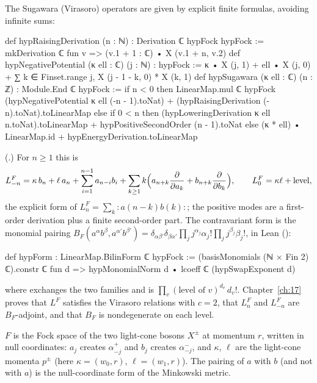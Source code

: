 The Sugawara (Virasoro) operators are given by explicit finite formulas, avoiding infinite sums:
\begin{leancode}
def hypRaisingDerivation (n : ℕ) : Derivation ℂ hypFock hypFock :=
  mkDerivation ℂ fun v => (v.1 + 1 : ℂ) • X (v.1 + n, v.2)
def hypNegativePotential (κ ell : ℂ) (j : ℕ) : hypFock :=
  κ • X (j, 1) + ell • X (j, 0) +
    ∑ k ∈ Finset.range j, X (j - 1 - k, 0) * X (k, 1)
def hypSugawara (κ ell : ℂ) (n : ℤ) : Module.End ℂ hypFock :=
  if n < 0 then
    LinearMap.mul ℂ hypFock (hypNegativePotential κ ell (-n - 1).toNat) +
      (hypRaisingDerivation (-n).toNat).toLinearMap
  else if 0 < n then
    (hypLoweringDerivation κ ell n.toNat).toLinearMap +
      hypPositiveSecondOrder (n - 1).toNat
  else (κ * ell) • LinearMap.id + hypEnergyDerivation.toLinearMap
\end{leancode}
(.)  For $n\ge1$ this is
\begin{equation}\label{ch18:eq:sugawara}
  L^F_{-n}=\kappa\,b_n+\ell\,a_n+\sum_{i=1}^{n-1}a_{n-i}b_i+\sum_{k\ge1}k\Bigl(a_{n+k}\frac{\partial}{\partial a_k}
  +b_{n+k}\frac{\partial}{\partial b_k}\Bigr),\qquad L^F_0=\kappa\ell+\text{level},
\end{equation}
the explicit form of $L^F_n=\sum_k{:}a(n-k)b(k){:}$; the positive modes are a first-order derivation plus a
finite second-order part.  The contravariant form is the monomial pairing
$B_F(a^\alpha b^\beta,a^{\alpha'}b^{\beta'})=\delta_{\alpha\beta'}\delta_{\beta\alpha'}\prod_jj^{\alpha_j}\alpha_j!\prod_jj^{\beta_j}\beta_j!$,
in Lean  ():
\begin{leancode}
def hypForm : LinearMap.BilinForm ℂ hypFock :=
  (basisMonomials (ℕ × Fin 2) ℂ).constr ℂ fun d =>
    hypMonomialNorm d • lcoeff ℂ (hypSwapExponent d)
\end{leancode}
where  exchanges the two families and  is
$\prod_v(\text{level of }v)^{d_v}\,d_v!$.  Chapter~\ref{ch:17} proves that $L^F$ satisfies the
Virasoro relations with $c=2$, that $L^F_n$ and $L^F_{-n}$ are $B_F$-adjoint, and that $B_F$ is
nondegenerate on each level.

\begin{physics}
$F$ is the Fock space of the two light-cone bosons $X^\pm$ at momentum $r$, written in null coordinates:
$a_j$ creates $\alpha^+_{-j}$ and $b_j$ creates $\alpha^-_{-j}$, and $\kappa$, $\ell$ are the
light-cone momenta $p^\pm$ (here $\kappa=(w_0,r)$, $\ell=(w_1,r)$).  The pairing of $a$ with $b$ (and not with $a$) is the null-coordinate form of
the Minkowski metric.
\end{physics}

